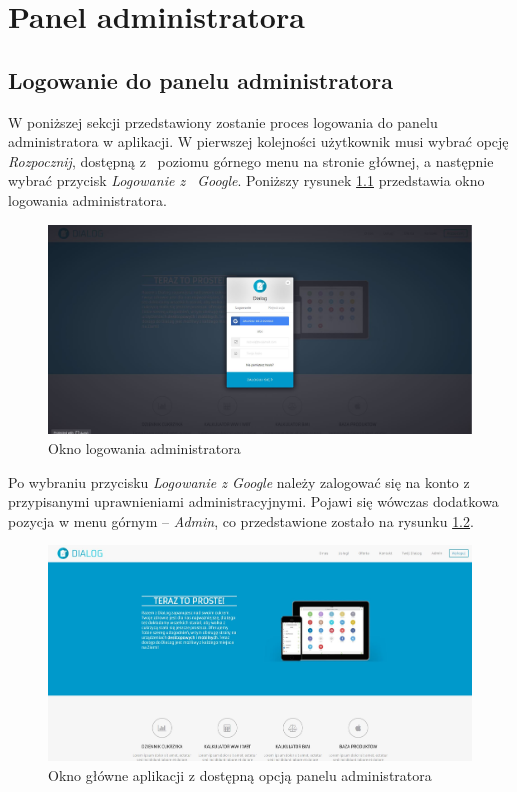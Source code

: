 \chapter{Panel administratora}

\section{Logowanie do panelu administratora}
W poniższej sekcji przedstawiony zostanie proces logowania do panelu administratora w aplikacji. W pierwszej kolejności użytkownik musi wybrać opcję \textit{Rozpocznij}, dostępną z~ poziomu górnego menu na stronie głównej, a następnie wybrać przycisk \textit{Logowanie z~ Google}. Poniższy rysunek \ref{Rys:logowanieee} przedstawia okno logowania administratora.

\begin{figure}[h]
	\centering\includegraphics[scale=0.3]{images/logowanie_google.jpg}
	\caption{Okno logowania administratora}
	\label{Rys:logowanieee}
\end{figure}

Po wybraniu przycisku \textit{Logowanie z Google} należy zalogować się na konto z przypisanymi uprawnieniami administracyjnymi. Pojawi się wówczas dodatkowa pozycja w menu górnym -- \textit{Admin}, co przedstawione zostało na rysunku \ref{Rys:ekran_admin}.

\newpage

\begin{figure}[h]
	\centering\includegraphics[scale=0.3]{images/ekran_admin.jpg}
	\caption{Okno główne aplikacji z dostępną opcją panelu administratora}
	\label{Rys:ekran_admin}
\end{figure}

